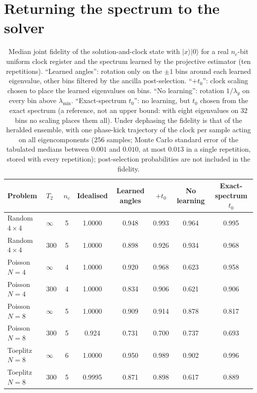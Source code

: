 \documentclass[journal]{IEEEtran}
\newcommand{\lmin}{\lambda_{\min}}
\begin{document}
\section{Returning the spectrum to the solver}
\label{sec:return}

\begin{table}[t]
\caption{Median joint fidelity of the solution-and-clock state with $|x\rangle|0\rangle$ for a real $n_c$-bit uniform clock register and the spectrum learned by the projective estimator (ten repetitions). ``Learned angles'': rotation only on the $\pm1$ bins around each learned eigenvalue, other bins filtered by the ancilla post-selection. ``$+t_0$'': clock scaling chosen to place the learned eigenvalues on bins. ``No learning'': rotation $1/\lambda_y$ on every bin above $\lmin$. ``Exact-spectrum $t_0$'': no learning, but $t_0$ chosen from the exact spectrum (a reference, not an upper bound: with eight eigenvalues on 32 bins no scaling places them all). Under dephasing the fidelity is that of the heralded ensemble, with one phase-kick trajectory of the clock per sample acting on all eigencomponents ($256$ samples; Monte Carlo standard error of the tabulated medians between $0.001$ and $0.010$, at most $0.013$ in a single repetition, stored with every repetition); post-selection probabilities are not included in the fidelity.}
\label{tab:clock}
\centering\footnotesize
\begin{tabular}{llcccccc}
\toprule
Problem & $T_2$ & $n_c$ & Idealised & Learned angles & $+t_0$ & No learning & Exact-spectrum $t_0$ \\
\midrule
Random $4\times4$ & $\infty$ & 5 & 1.0000 & 0.948 & 0.993 & 0.964 & 0.995\\
Random $4\times4$ & 300 & 5 & 1.0000 & 0.898 & 0.926 & 0.934 & 0.968\\
Poisson $N=4$ & $\infty$ & 4 & 1.0000 & 0.920 & 0.968 & 0.623 & 0.958\\
Poisson $N=4$ & 300 & 4 & 1.0000 & 0.834 & 0.906 & 0.621 & 0.906\\
Poisson $N=8$ & $\infty$ & 5 & 1.0000 & 0.909 & 0.914 & 0.878 & 0.817\\
Poisson $N=8$ & 300 & 5 & 0.924 & 0.731 & 0.700 & 0.737 & 0.693\\
Toeplitz $N=8$ & $\infty$ & 6 & 1.0000 & 0.950 & 0.989 & 0.902 & 0.996\\
Toeplitz $N=8$ & 300 & 5 & 0.9995 & 0.871 & 0.898 & 0.617 & 0.889\\
\bottomrule
\end{tabular}
\end{table}
\end{document}
